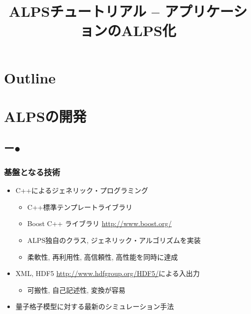 \title{ALPSチュートリアル -- アプリケーションのALPS化}




\begin{frame}
  \titlepage
\end{frame}

\section*{Outline}
\begin{frame}
  \tableofcontents
\end{frame}

\section{ALPSの開発}
\subsection*{{\protect\color{red}ー}{\protect\color{blue}●}}

\begin{frame}
  \frametitle{基盤となる技術}
  \begin{itemize}
    \setlength{\itemsep}{1em}
  \item C++によるジェネリック・プログラミング
    \begin{itemize}
    \item C++標準テンプレートライブラリ
    \item Boost C++ ライブラリ \url{http://www.boost.org/}
    \item ALPS独自のクラス, ジェネリック・アルゴリズムを実装
    \item 柔軟性, 再利用性, 高信頼性, 高性能を同時に達成
    \end{itemize}
  \item XML, HDF5 \url{http://www.hdfgroup.org/HDF5/}による入出力
    \begin{itemize}
    \item 可搬性, 自己記述性, 変換が容易
    \end{itemize}
  \item 量子格子模型に対する最新のシミュレーション手法
  \end{itemize}
\end{frame}


